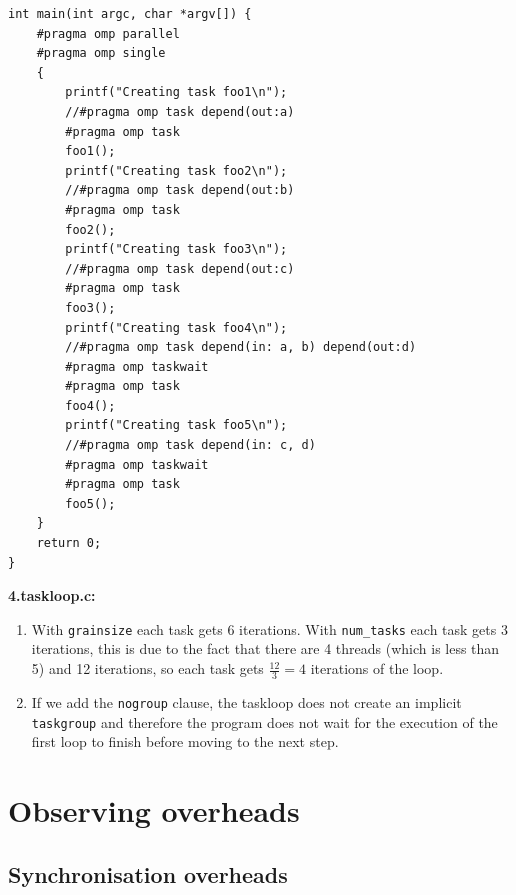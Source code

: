 \begin{enumerate}[label=\Alph*)]
\begin{enumerate}[label=\arabic*.]
        \begin{verbatim}
int main(int argc, char *argv[]) {
    #pragma omp parallel
    #pragma omp single
    {
    	printf("Creating task foo1\n");
    	//#pragma omp task depend(out:a)
        #pragma omp task
    	foo1();
    	printf("Creating task foo2\n");
    	//#pragma omp task depend(out:b)
        #pragma omp task
    	foo2();
    	printf("Creating task foo3\n");
    	//#pragma omp task depend(out:c)
        #pragma omp task
    	foo3();
    	printf("Creating task foo4\n");
    	//#pragma omp task depend(in: a, b) depend(out:d)
        #pragma omp taskwait
        #pragma omp task
    	foo4();
    	printf("Creating task foo5\n");
    	//#pragma omp task depend(in: c, d)
        #pragma omp taskwait
        #pragma omp task
    	foo5();
    }
    return 0;
}
        \end{verbatim}
    \end{enumerate}
    \textbf{4.taskloop.c:}
    \begin{enumerate}[label=\arabic*.]
        \item With \texttt{grainsize} each task gets 6 iterations.
        With \texttt{num\_tasks} each task gets 3 iterations, this is due to the fact that there are 4 threads (which is less
        than 5) and 12 iterations, so each task gets $\frac{12}{3} = 4$ iterations of the loop.
        \item If we add the \texttt{nogroup} clause, the taskloop does not create an implicit \texttt{taskgroup} and therefore the program
        does not wait for the execution of the first loop to finish before moving to the next step.
    \end{enumerate}
\end{enumerate}

\section{Observing overheads}
\label{sec:observing_overheads}

\subsection{Synchronisation overheads}

